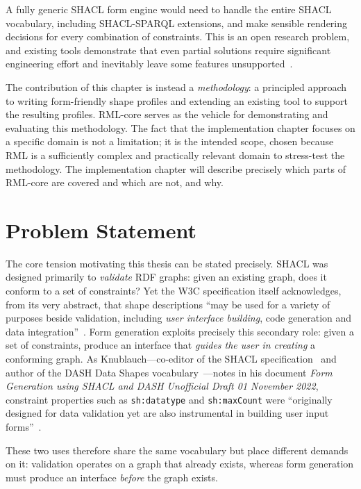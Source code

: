 A fully generic SHACL form engine would need to handle the entire SHACL vocabulary, including SHACL-SPARQL extensions, and make sensible rendering decisions for every combination of constraints.
This is an open research problem, and existing tools demonstrate that even partial solutions require significant engineering effort and inevitably leave some features unsupported~\cite{ulb-darmstadt-shacl-form}.

The contribution of this chapter is instead a \emph{methodology}: a principled approach to writing form-friendly shape profiles and extending an existing tool to support the resulting profiles.
RML-core serves as the vehicle for demonstrating and evaluating this methodology. The fact that the implementation chapter focuses on a specific domain is not a limitation; it is the intended scope, chosen because RML is a sufficiently complex and practically relevant domain to stress-test the methodology.
The implementation chapter will describe precisely which parts of RML-core are covered and which are not, and why.

\section{Problem Statement}
\label{sec:problem-statement}

The core tension motivating this thesis can be stated precisely. SHACL was designed primarily to \emph{validate} RDF graphs: given an existing graph, does it conform to a set of constraints?
Yet the W3C specification itself acknowledges, from its very abstract, that shape descriptions ``may be used for a variety of purposes beside validation, including \emph{user interface building}, code generation and data integration''~\cite{w3c-shacl}.
Form generation exploits precisely this secondary role: given a set of constraints, produce an interface that \emph{guides the user in creating} a conforming graph.
As Knublauch---co-editor of the SHACL specification~\cite{w3c-shacl} and author of the DASH Data Shapes vocabulary~\cite{dash-spec}---notes in his document \textit{Form Generation using SHACL and DASH Unofficial Draft 01 November 2022}, constraint properties such as \texttt{sh:datatype} and \texttt{sh:maxCount} were ``originally designed for data validation yet are also instrumental in building user input forms''~\cite{dash-forms}.

These two uses therefore share the same vocabulary but place different demands on it: validation operates on a graph that already exists, whereas form generation must produce an interface \emph{before} the graph exists.


